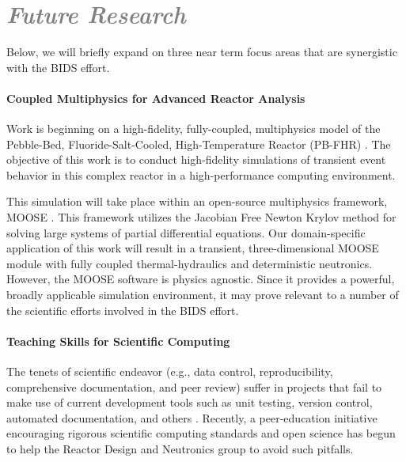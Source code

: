 \documentclass[a4paper, 10pt]{article}
\begin{document}
\section*{\textcolor{gray}{\it Future Research}}

Below, we will briefly expand on three near term 
focus areas that are synergistic with the BIDS effort.  

\paragraph{Coupled Multiphysics for Advanced Reactor Analysis}

Work is beginning on a high-fidelity, fully-coupled, multiphysics model of the 
Pebble-Bed, Fluoride-Salt-Cooled, High-Temperature Reactor (PB-FHR) 
\cite{facilitators_fluoride-salt-cooled_2013, 
facilitators_fluoride-salt-cooled_2013-1, 
facilitators_fluoride-salt-cooled_2013-2, 
facilitators_fluoride-salt-cooled_2013-3}. The objective of this work is to 
conduct high-fidelity simulations of transient event behavior in this complex 
reactor in a high-performance computing environment.

This simulation will take place within an open-source 
multiphysics framework, MOOSE \cite{gaston_moose:_2009}. 
This framework utilizes the Jacobian Free 
Newton Krylov method for solving large systems of partial differential 
equations. 
Our domain-specific application of this work will result in a transient, 
three-dimensional MOOSE module with fully coupled thermal-hydraulics and 
deterministic neutronics. However, the MOOSE software is physics agnostic. Since 
it provides a powerful, broadly applicable simulation environment, it may prove 
relevant to a number of the scientific efforts involved in the BIDS effort. 


\paragraph{Teaching Skills for Scientific Computing}
The tenets of scientific endeavor (e.g., data control, 
reproducibility, comprehensive documentation, and peer review) suffer in 
projects that fail to make use of current development tools such as unit 
testing, version control, automated documentation, and others 
\cite{wilson_best_2014, merali_computational_2010}.  Recently, a peer-education 
initiative \cite{huff_hacker_2014} encouraging rigorous 
scientific computing standards and open science has begun to help the Reactor 
Design and Neutronics group to avoid such pitfalls.
\end{document}
